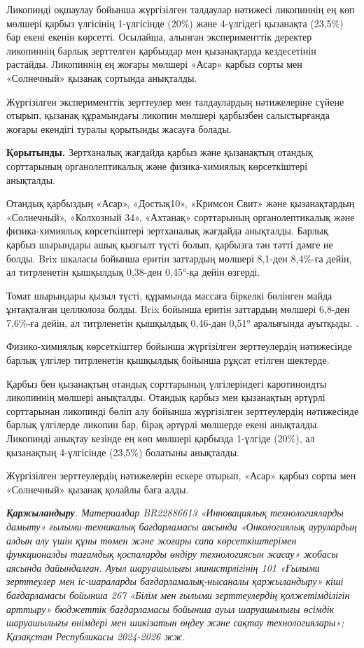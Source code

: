 Ликопинді оқшаулау бойынша жүргізілген талдаулар нәтижесі ликопиннің ең
көп мөлшері қарбыз үлгісінің 1-үлгісінде (20\%) және 4-үлгідегі
қызанақта (23,5\%) бар екені екенін көрсетті. Осылайша, алынған
эксперименттік деректер ликопиннің барлық зерттелген қарбыздар мен
қызанақтарда кездесетінін растайды. Ликопиннің ең жоғары мөлшері «Асар»
қарбыз сорты мен «Солнечный» қызанақ сортында анықталды.

Жүргізілген эксперименттік зерттеулер мен талдаулардың нәтижелеріне
сүйене отырып, қызанақ құрамындағы ликопин мөлшері қарбызбен
салыстырғанда жоғары екендігі туралы қорытынды жасауға болады.

{\bfseries Қорытынды.} Зертханалық жағдайда қарбыз және қызанақтың отандық
сорттарының органолептикалық және физика-химиялық көрсеткіштері
анықталды.

Отандық қарбыздың «Асар», «Достық10», «Кримсон Свит» және қызанақтардың
«Солнечный», «Колхозный 34», «Ахтанақ» сорттарының органолептикалық және
физика-химиялық көрсеткіштері зертханалық жағдайда анықталды. Барлық
қарбыз шырындары ашық қызғылт түсті болып, қарбызға тән тәтті дәмге ие
болды. Brix шкаласы бойынша еритін заттардың мөлшері 8,1-ден 8,4\%-ға
дейін, ал титрленетін қышқылдық 0,38-ден 0,45°-қа дейін өзгерді.

Томат шырындары қызыл түсті, құрамында массаға біркелкі бөлінген майда
ұнтақталған целлюлоза болды. Brix бойынша еритін заттардың мөлшері
6,8-ден 7,6\%-ға дейін, ал титрленетін қышқылдық 0,46-дан 0,51°
аралығында ауытқыды. .

Физико-химиялық көрсеткіштер бойынша жүргізілген зерттеулердің
нәтижесінде барлық үлгілер титрленетін қышқылдық бойынша рұқсат етілген
шектерде.

Қарбыз бен қызанақтың отандық сорттарының үлгілеріндегі каротиноидты
ликопиннің мөлшері анықталды. Отандық қарбыз мен қызанақтың әртүрлі
сорттарынан ликопинді бөліп алу бойынша жүргізілген зерттеулердің
нәтижесінде барлық үлгілерде ликопин бар, бірақ әртүрлі мөлшерде екені
анықталды. Ликопинді анықтау кезінде ең көп мөлшері қарбызда 1-үлгіде
(20\%), ал қызанақтың 4-үлгісінде (23,5\%) болатыны анықталды.

Жүргізілген зерттеулердің нәтижелерін ескере отырып, «Асар» қарбыз сорты
мен «Солнечный» қызанақ қолайлы баға алды.

\emph{{\bfseries Қаржыландыру}. Материалдар BR22886613 «Инновациялық
технологияларды дамыту» ғылыми-техникалық бағдарламасы аясында
«Онкологиялық аурулардың алдын алу үшін құны төмен және жоғары сапа
көрсеткіштерімен функционалды тағамдық қоспаларды өндіру технологиясын
жасау» жобасы аясында дайындалған. Ауыл шаруашылығы министрлігінің 101
«Ғылыми зерттеулер мен іс-шараларды бағдарламалық-нысаналы қаржыландыру»
кіші бағдарламасы бойынша 267 «Білім мен ғылыми зерттеулердің
қолжетімділігін арттыру» бюджеттік бағдарламасы бойынша ауыл шаруашылығы
өсімдік шаруашылығы өнімдері мен шикізатын өңдеу және сақтау
технологиялары»; Қазақстан Республикасы 2024-2026 жж.}

